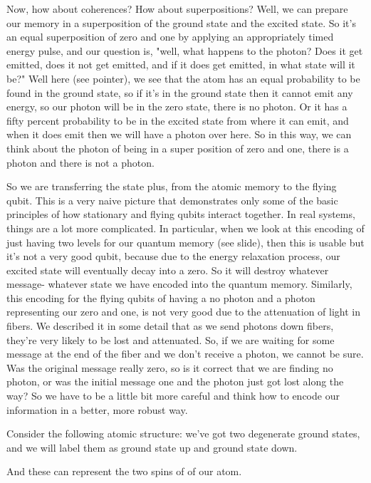 Now, how about coherences? How about superpositions? Well, we can prepare our memory in a superposition of the ground state and the excited state. So it's an equal superposition of zero and one by applying an appropriately timed energy pulse, and our question is, "well, what happens to the photon? Does it get emitted, does it not get emitted, and if it does get emitted, in what state will it be?" Well here (see pointer), we see that the atom has an equal probability to be found in the ground state, so if it's in the ground state then it cannot emit any energy, so our photon will be in the zero state, there is no photon. Or it has a fifty percent probability to be in the excited state from where it can emit, and when it does emit then we will have a photon over here. So in this way, we can think about the photon of being in a super position of zero and one, there is a photon and there is not a photon.

So we are transferring the state plus, from the atomic memory to the flying qubit. This is a very naive picture that demonstrates only some of the basic principles of how stationary and flying qubits interact together. In real systems, things are a lot more complicated. In particular, when we look at this encoding of just having two levels for our quantum memory (see slide), then this is usable but it's not a very good qubit, because due to the energy relaxation process, our excited state will eventually decay into a zero. So it will destroy whatever message- whatever state we have encoded into the quantum memory. Similarly, this encoding for the flying qubits of having a no photon and a photon representing our zero and one, is not very good due to the attenuation of light in fibers. We described it in some detail that as we send photons down fibers, they're very likely to be lost and attenuated. So, if we are waiting for some message at the end of the fiber and we don't receive a photon, we cannot be sure. Was the original message really zero, so is it correct that we are finding no photon, or was the initial message one and the photon just got lost along the way? So we have to be a little bit more careful and think how to encode our information in a better, more robust way.

Consider the following atomic structure: we've got two degenerate ground states, and we will label them as ground state up and ground state down.

And these can represent the two spins of of our atom.

